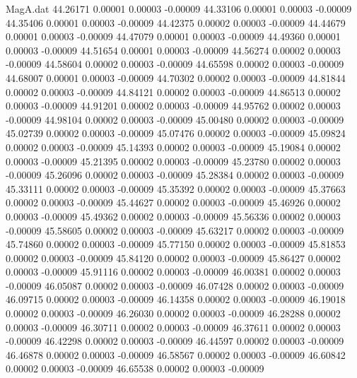 \begin{filecontents}{MagA.dat}
  44.26171    0.00001    0.00003   -0.00009
  44.33106    0.00001    0.00003   -0.00009
  44.35406    0.00001    0.00003   -0.00009
  44.42375    0.00002    0.00003   -0.00009
  44.44679    0.00001    0.00003   -0.00009
  44.47079    0.00001    0.00003   -0.00009
  44.49360    0.00001    0.00003   -0.00009
  44.51654    0.00001    0.00003   -0.00009
  44.56274    0.00002    0.00003   -0.00009
  44.58604    0.00002    0.00003   -0.00009
  44.65598    0.00002    0.00003   -0.00009
  44.68007    0.00001    0.00003   -0.00009
  44.70302    0.00002    0.00003   -0.00009
  44.81844    0.00002    0.00003   -0.00009
  44.84121    0.00002    0.00003   -0.00009
  44.86513    0.00002    0.00003   -0.00009
  44.91201    0.00002    0.00003   -0.00009
  44.95762    0.00002    0.00003   -0.00009
  44.98104    0.00002    0.00003   -0.00009
  45.00480    0.00002    0.00003   -0.00009
  45.02739    0.00002    0.00003   -0.00009
  45.07476    0.00002    0.00003   -0.00009
  45.09824    0.00002    0.00003   -0.00009
  45.14393    0.00002    0.00003   -0.00009
  45.19084    0.00002    0.00003   -0.00009
  45.21395    0.00002    0.00003   -0.00009
  45.23780    0.00002    0.00003   -0.00009
  45.26096    0.00002    0.00003   -0.00009
  45.28384    0.00002    0.00003   -0.00009
  45.33111    0.00002    0.00003   -0.00009
  45.35392    0.00002    0.00003   -0.00009
  45.37663    0.00002    0.00003   -0.00009
  45.44627    0.00002    0.00003   -0.00009
  45.46926    0.00002    0.00003   -0.00009
  45.49362    0.00002    0.00003   -0.00009
  45.56336    0.00002    0.00003   -0.00009
  45.58605    0.00002    0.00003   -0.00009
  45.63217    0.00002    0.00003   -0.00009
  45.74860    0.00002    0.00003   -0.00009
  45.77150    0.00002    0.00003   -0.00009
  45.81853    0.00002    0.00003   -0.00009
  45.84120    0.00002    0.00003   -0.00009
  45.86427    0.00002    0.00003   -0.00009
  45.91116    0.00002    0.00003   -0.00009
  46.00381    0.00002    0.00003   -0.00009
  46.05087    0.00002    0.00003   -0.00009
  46.07428    0.00002    0.00003   -0.00009
  46.09715    0.00002    0.00003   -0.00009
  46.14358    0.00002    0.00003   -0.00009
  46.19018    0.00002    0.00003   -0.00009
  46.26030    0.00002    0.00003   -0.00009
  46.28288    0.00002    0.00003   -0.00009
  46.30711    0.00002    0.00003   -0.00009
  46.37611    0.00002    0.00003   -0.00009
  46.42298    0.00002    0.00003   -0.00009
  46.44597    0.00002    0.00003   -0.00009
  46.46878    0.00002    0.00003   -0.00009
  46.58567    0.00002    0.00003   -0.00009
  46.60842    0.00002    0.00003   -0.00009
  46.65538    0.00002    0.00003   -0.00009

\end{filecontents}
